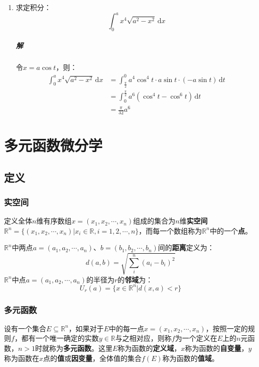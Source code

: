 \documentclass[fontset=none,openany,a4paper]{ctexbook}
\begin{document}
\begin{enumerate}
    \item 求定积分：
    \[
    \int_0^a x^4\sqrt{a^2 -x^2}\,\mathrm{d}x
    \]

    \paragraph{解}

    令$x = a\cos t$，则：
    \begin{align*}
        \int_0^a x^4\sqrt{a^2 -x^2}\,\mathrm{d}x
        &= \int_\tfrac{\pi}{2}^0 a^4\cos^4 t \cdot a\sin t \cdot (-a\sin t)\,\mathrm{d}t \\
        &= \int_0^\tfrac{\pi}{2} a^6(\cos^4 t-\cos^6 t)\,\mathrm{d}t \\
        &= \frac{\pi}{32}a^6
    \end{align*}

\end{enumerate}

\chapter{多元函数微分学}

\section{定义}

\subsection{实空间}

定义全体$n$维有序数组$x=(x_1,x_2,\cdots,x_n)$组成的集合为$n$维\textbf{实空间}$\mathbb{R}^n=\{(x_1,x_2,\cdots,x_n)|x_i\in\mathbb{R},i=1,2,\cdots,n\}$，而每一个数组称为$\mathbb{R}^n$中的一个\textbf{点}。

$\mathbb{R}^n$中两点$a=(a_1,a_2,\cdots,a_n)$、$b=(b_1,b_2,\cdots,b_n)$间的\textbf{距离}定义为：
\[
d(a,b) = \sqrt{\sum_i^n(a_i-b_i)^2}
\]
$\mathbb{R}^n$中点$a=(a_1,a_2,\cdots,a_n)$的半径为$r$的\textbf{邻域}为：
\[
U_r(a) = \{x\in\mathbb{R}^n|d(x,a)<r\}
\]

\subsection{多元函数}

设有一个集合$E\subseteq\mathbb{R}^n$，如果对于$E$中的每一点$x=(x_1,x_2,\cdots,x_n)$，按照一定的规则$f$，都有一个唯一确定的实数$y\in\mathbb{R}$与之相对应，则称$f$为一个定义在$E$上的$n$元函数，$n>1$时就称为\textbf{多元函数}。这里$E$称为函数的\textbf{定义域}，$x$称为函数的\textbf{自变量}，$y$称为函数在$x$点的\textbf{值}或\textbf{因变量}，全体值的集合$f(E)$称为函数的\textbf{值域}。
\end{document}
